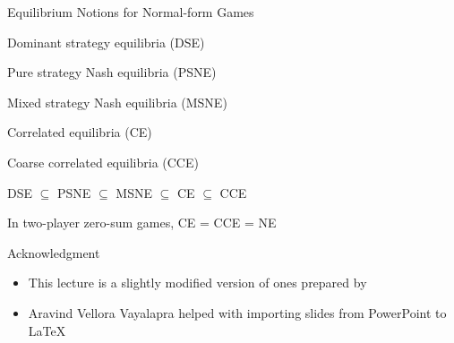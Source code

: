 \documentclass[11pt,aspectratio=169,handout]{beamer}
\begin{document}
  \begin{frame}{Equilibrium Notions for Normal-form Games}
   \begin{itemizes}
    \item Dominant strategy equilibria (DSE)
    \item Pure strategy Nash equilibria (PSNE)
    \item Mixed strategy Nash equilibria (MSNE)
    \item Correlated equilibria (CE)
    \item Coarse correlated equilibria (CCE)
    \item<2-> DSE $\subseteq$ PSNE $\subseteq$ MSNE $\subseteq$ CE $\subseteq$ CCE
    \item<3-> In two-player zero-sum games, CE = CCE = NE
   \end{itemizes}
  \end{frame}
  
  \begin{frame}{Acknowledgment}
   \begin{itemize}
    \setlength{\itemsep}{1em}
    \item This lecture is a slightly modified version of ones prepared by
    \item Aravind Vellora Vayalapra helped with importing slides from PowerPoint to \LaTeX
   \end{itemize}
  \end{frame}
 
\end{document}

